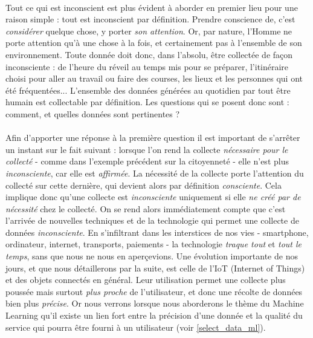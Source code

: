 \paragraph{} Tout ce qui est inconscient est plus évident à aborder en premier lieu pour une raison simple : tout est
inconscient par définition. Prendre conscience de, c'est \emph{considérer} quelque chose, y porter \emph{son attention}.
Or, par nature, l'Homme ne porte attention qu'à une chose à la fois, et certainement pas à l'ensemble de son
environnement. Toute donnée doit donc, dans l'absolu, être collectée de façon inconsciente : de l'heure du réveil au
temps mis pour se préparer, l'itinéraire choisi pour aller au travail ou faire des courses, les lieux et les personnes
qui ont été fréquentées... L'ensemble des données générées au quotidien par tout être humain est collectable par
définition. Les questions qui se posent donc sont : comment, et quelles données sont pertinentes ?

\paragraph{} Afin d'apporter une réponse à la première question il est important de s'arrêter un instant sur le fait
suivant : lorsque l'on rend la collecte \emph{nécessaire pour le collecté} - comme dans l'exemple précédent sur la
citoyenneté - elle n'est plus \emph{inconsciente}, car elle est \emph{affirmée}. La nécessité de la collecte porte
l'attention du collecté sur cette dernière, qui devient alors par définition \emph{consciente}. Cela
implique donc qu'une collecte est \emph{inconsciente} uniquement si elle \emph{ne créé par de nécessité}
chez le collecté. On se rend alors immédiatement compte que c'est l'arrivée de nouvelles techniques et de la
technologie qui permet une collecte de données \emph{inconsciente}. En s'infiltrant dans les interstices de nos vies -
smartphone, ordinateur, internet, transports, paiements - la technologie \emph{traque tout} et \emph{tout le temps},
sans que nous ne nous en aperçevions. Une évolution importante de nos jours, et que nous détaillerons par la suite, est
celle de l'IoT (Internet of Things) et des objets connectés en général. Leur utilisation permet une collecte plus
poussée mais surtout \emph{plus proche} de l'utilisateur, et donc une récolte de données bien plus \emph{précise}. Or
nous verrons lorsque nous aborderons le thème du Machine Learning qu'il existe un lien fort entre la précision d'une
donnée et la qualité du service qui pourra être fourni à un utilisateur (voir \ref{select_data_ml}).

